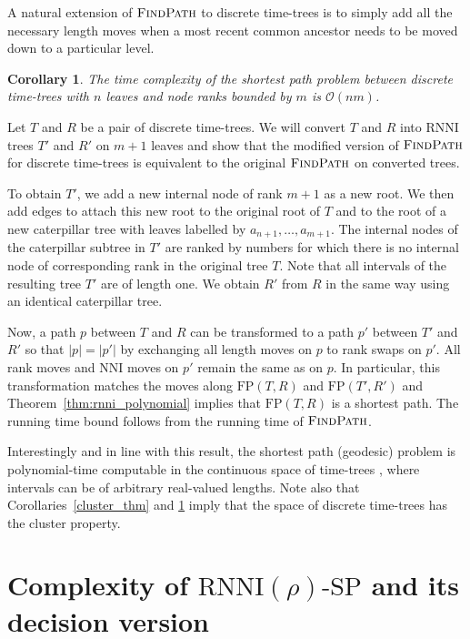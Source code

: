 \documentclass[11pt]{amsart}
\newtheorem{corollary}{Corollary}
\newcommand{\rnni}{\mathrm{RNNI}}
\newcommand{\findpath}{\textsc{FindPath}}
\newcommand{\nni}{\mathrm{NNI}}
\newcommand{\fp}{\mathrm{FP}}
\newcommand{\decprob}[1]{\rnni(#1)\text{-}\mathrm{SP}}
\renewcommand{\O}{\mathcal O}
\begin{document}
A natural extension of $\findpath$ to discrete time-trees is to simply add all the necessary length moves when a most recent common ancestor needs to be moved down to a particular level.
\begin{corollary}
The time complexity of the shortest path problem between discrete time-trees with $n$ leaves and node ranks bounded by $m$ is $\O(nm)$.
\label{cor:fp_dtt}
\end{corollary}

\proof
Let $T$ and $R$ be a pair of discrete time-trees.
We will convert $T$ and $R$ into $\rnni$ trees $T'$ and $R'$ on $m + 1$ leaves and show that the modified version of $\findpath$ for discrete time-trees is equivalent to the original $\findpath$ on converted trees.

To obtain $T'$, we add a new internal node of rank $m + 1$ as a new root.
We then add edges to attach this new root to the original root of $T$ and to the root of a new caterpillar tree with leaves labelled by $a_{n + 1}, \ldots, a_{m + 1}$.
The internal nodes of the caterpillar subtree in $T'$ are ranked by numbers for which there is no internal node of corresponding rank in the original tree $T$.
Note that all intervals of the resulting tree $T'$ are of length one.
We obtain $R'$ from $R$ in the same way using an identical caterpillar tree.

Now, a path $p$ between $T$ and $R$ can be transformed to a path $p'$ between $T'$ and $R'$ so that $|p| = |p'|$ by exchanging all length moves on $p$ to rank swaps on $p'$.
All rank moves and $\nni$ moves on $p'$ remain the same as on $p$.
In particular, this transformation matches the moves along $\fp(T,R)$ and $\fp(T',R')$ and Theorem~\ref{thm:rnni_polynomial} implies that $\fp(T, R)$ is a shortest path.
The running time bound follows from the running time of $\findpath$.
\endproof

Interestingly and in line with this result, the shortest path (geodesic) problem is polynomial-time computable in the continuous space of time-trees \autocite{Gavryushkin2016-uu}, where intervals can be of arbitrary real-valued lengths.
Note also that Corollaries~\ref{cluster_thm} and \ref{cor:fp_dtt} imply that the space of discrete time-trees has the cluster property.


\section{Complexity of $\decprob{\rho}$ and its decision version}
\end{document}
